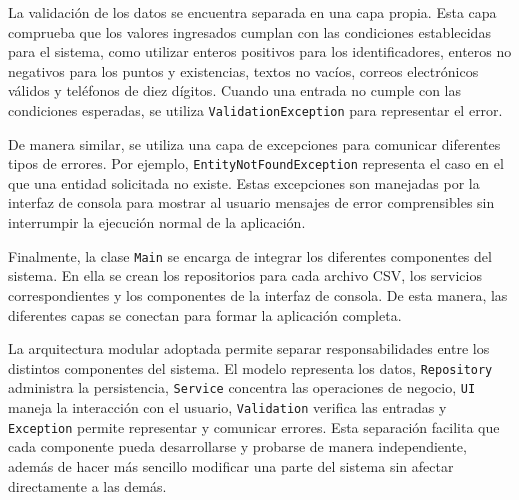 La validación de los datos se encuentra separada en una capa propia. Esta capa comprueba que los valores ingresados cumplan con las condiciones establecidas para el sistema, como utilizar enteros positivos para los identificadores, enteros no negativos para los puntos y existencias, textos no vacíos, correos electrónicos válidos y teléfonos de diez dígitos. Cuando una entrada no cumple con las condiciones esperadas, se utiliza \texttt{ValidationException} para representar el error.

De manera similar, se utiliza una capa de excepciones para comunicar diferentes tipos de errores. Por ejemplo, \texttt{EntityNotFoundException} representa el caso en el que una entidad solicitada no existe. Estas excepciones son manejadas por la interfaz de consola para mostrar al usuario mensajes de error comprensibles sin interrumpir la ejecución normal de la aplicación.

Finalmente, la clase \texttt{Main} se encarga de integrar los diferentes componentes del sistema. En ella se crean los repositorios para cada archivo CSV, los servicios correspondientes y los componentes de la interfaz de consola. De esta manera, las diferentes capas se conectan para formar la aplicación completa.

La arquitectura modular adoptada permite separar responsabilidades entre los distintos componentes del sistema. El modelo representa los datos, \texttt{Repository} administra la persistencia, \texttt{Service} concentra las operaciones de negocio, \texttt{UI} maneja la interacción con el usuario, \texttt{Validation} verifica las entradas y \texttt{Exception} permite representar y comunicar errores. Esta separación facilita que cada componente pueda desarrollarse y probarse de manera independiente, además de hacer más sencillo modificar una parte del sistema sin afectar directamente a las demás.

